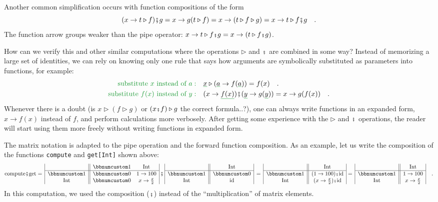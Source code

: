 Another common simplification occurs with function compositions of
the form
\[
(x\rightarrow t\triangleright f)\bef g=x\rightarrow g(t\triangleright f)=x\rightarrow(t\triangleright f\triangleright g)=x\rightarrow t\triangleright f\bef g\quad.
\]
The function arrow groups weaker than the pipe operator: $x\rightarrow t\triangleright f\bef g=x\rightarrow(t\triangleright f\bef g)$.

How can we verify this and other similar computations where the operations
$\triangleright$ and $\bef$ are combined in some way? Instead of
memorizing a large set of identities, we can rely on knowing only
one rule that says how arguments are symbolically substituted as parameters
into functions, for example:
\begin{align*}
{\color{greenunder}\text{substitute }x\text{ instead of }a:}\quad & \gunderline x\triangleright(\gunderline a\rightarrow f(\gunderline a))=f(x)\quad.\\
{\color{greenunder}\text{substitute }f(x)\text{ instead of }y:}\quad & (x\rightarrow\gunderline{f(x)})\bef(\gunderline y\rightarrow g(\gunderline y))=x\rightarrow g(f(x))\quad.
\end{align*}
Whenever there is a doubt (is $x\triangleright(f\triangleright g)$
or $(x\bef f)\triangleright g$ the correct formula..?), one can always
write functions in an expanded form, $x\rightarrow f(x)$ instead
of $f$, and perform calculations more verbosely. After getting some
experience with the $\triangleright$ and $\bef$ operations, the
reader will start using them more freely without writing functions
in expanded form.

The matrix notation is adapted to the pipe operation and the forward
function composition. As an example, let us write the composition
of the functions \lstinline!compute! and \lstinline!get[Int]! shown
above: 
\[
\text{compute}\bef\text{get}=\,\begin{array}{|c||cc|}
 & \bbnum 1 & \text{Int}\\
\hline \bbnum 1 & \bbnum 0 & 1\rightarrow100\\
\text{Int} & \bbnum 0 & x\rightarrow\frac{x}{2}
\end{array}\,\bef\,\begin{array}{|c||c|}
 & \text{Int}\\
\hline \bbnum 1 & \bbnum 0\\
\text{Int} & \text{id}
\end{array}\,=\,\begin{array}{|c||c|}
 & \text{Int}\\
\hline \bbnum 1 & (1\rightarrow100)\bef\text{id}\\
\text{Int} & (x\rightarrow\frac{x}{2})\bef\text{id}
\end{array}=\,\begin{array}{|c||c|}
 & \text{Int}\\
\hline \bbnum 1 & 1\rightarrow100\\
\text{Int} & x\rightarrow\frac{x}{2}
\end{array}\quad.
\]
In this computation, we used the composition ($\bef$) instead of
the \textsf{``}multiplication\textsf{''} of matrix elements.

